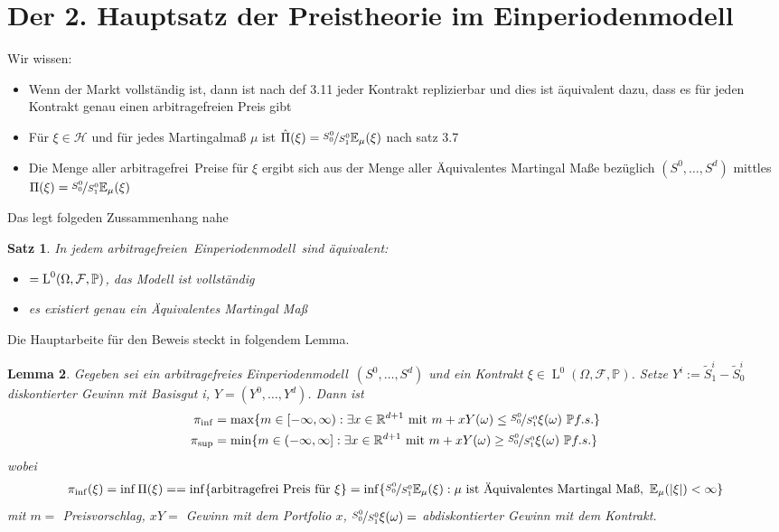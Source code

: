 \documentclass[]{scrartcl}
\numberwithin{equation}{section}
\theoremstyle{plain}
\newtheorem{satz}{Satz}[section]
\newtheorem{lem}[satz]{Lemma}
\theoremstyle{definition}
\theoremstyle{remark}
\theoremstyle{proof}
\renewcommand{\P}{\mathbb{P}}
\newcommand{\F}{\mathcal{F}}
\newcommand{\R}{\mathbb{R}}
\newcommand{\E}{\mathbb{E}}
\renewcommand{\L}{\operatorname{L}}
\newcommand{\Ss}{\nicefrac{S_0^0}{S_1^0}}
\newcommand{\epm}{Einperiodenmodell}
\newcommand{\af}{arbitragefrei}
\newcommand{\amm}{Äquivalentes Martingal Maß}
\begin{document}
 	\section{Der 2. Hauptsatz der Preistheorie im \epm}
 	Wir wissen:
 	\begin{itemize}
 		\item Wenn der Markt vollständig ist, dann ist nach def 3.11 jeder Kontrakt replizierbar und dies ist äquivalent dazu, dass es für jeden Kontrakt genau einen \af en Preis gibt
 		\item Für $\xi\in\mathcal{H}$ und für jedes Martingalmaß $\mu$ ist $\hat{\Pi}(\xi)=\nicefrac{S_0^0}{S_1^0}\E_{\mu}(\xi)$ nach satz 3.7
 		\item Die Menge aller \af \ Preise für $\xi$ ergibt sich aus der Menge aller \amm e bezüglich $(S^0,…,S^d)$ mittles $\Pi(\xi)=\nicefrac{S_0^0}{S_1^0}\E_{\mu}(\xi)$
 	\end{itemize}
 	Das legt folgeden Zussammenhang nahe
 	\begin{satz}
 		In jedem \af en\ \epm\ sind äquivalent:
 		\begin{itemize}
 			\item $\Huge=\operatorname{L}^0(\Omega,\F,\P)$, das Modell ist vollständig
 			\item es existiert genau ein \amm
 		\end{itemize}
 	\end{satz}
 	Die Hauptarbeite für den Beweis steckt in folgendem Lemma.
 	\begin{lem}
 		Gegeben sei ein \af es \epm\ $(S^0,…,S^d)$ und ein Kontrakt $\xi\in\L^0(\Omega,\F,\P)$. Setze $Y^i:=\tilde{S}^i_1-\tilde S_0^i$ diskontierter Gewinn mit Basisgut i, $Y=(Y^0,…,Y^d)$. Dann ist 
 		\begin{align*}
 			\pi_{\operatorname{inf}}&=\operatorname{max}\{m\in [-\infty,\infty): \exists x \in \R^{d+1} \text{ mit }m+xY(\omega)\le\nicefrac{S^0_0}{S^0_1}\xi(\omega)\ \P f.s. \}\\
 			\pi_{\operatorname{sup}}&=\operatorname{min}\{m\in (-\infty,\infty]: \exists x \in \R^{d+1} \text{ mit }m+xY(\omega)\ge\nicefrac{S^0_0}{S^0_1}\xi(\omega)\ \P f.s. \}
 		\end{align*}
 		wobei
 		\begin{align*}
 			\pi_{\inf}(\xi)=\inf\Pi(\xi)==\inf\{\text{\af\ Preis für }\xi \}=\inf\{\Ss\E_{\mu}(\xi):\mu\text{ ist \amm},\ \E_{\mu}(|\xi|)<\infty \}
 		\end{align*}
 		mit $m=$ Preisvorschlag, $xY=$ Gewinn mit dem Portfolio $x$, $\Ss\xi(\omega)=$ abdiskontierter Gewinn mit dem Kontrakt.
 	\end{lem}
\end{document}
